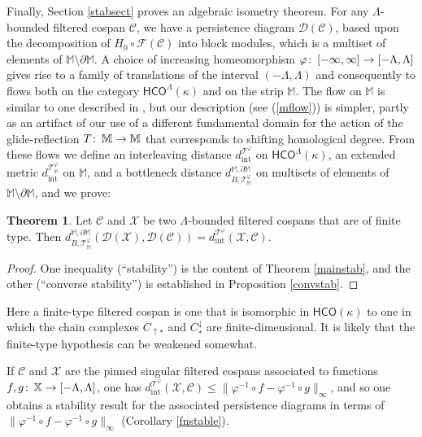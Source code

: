 \documentclass[11pt]{amsart}
\theoremstyle{definition}
\newtheorem{theorem}{Theorem}[section]
\theoremstyle{remark}
\numberwithin{equation}{section}
\def\co{\colon\thinspace}
\begin{document}
Finally, Section \ref{stabsect} proves an algebraic isometry theorem.  For any $\Lambda$-bounded filtered cospan $\mathcal{C}$, we have a persistence diagram $\mathcal{D}(\mathcal{C})$, based upon the decomposition of $H_0\circ\mathcal{F}(\mathcal{C})$ into block modules, which is a multiset of elements of $\mathbb{M}\setminus\partial\mathbb{M}$.  A choice of increasing homeomorphism $\varphi\co [-\infty,\infty]\to [-\Lambda,\Lambda]$ gives rise to a family of translations of the interval $(-\Lambda,\Lambda)$ and consequently to flows both on the category $\mathsf{HCO}^{\Lambda}(\kappa)$ and on the strip $\mathbb{M}$.  The flow on $\mathbb{M}$ is similar to one described in \cite[Section 4]{BBF21}, but our description (see (\ref{mflow})) is simpler, partly as an artifact of our use of a different fundamental domain for the action of the glide-reflection $T\co\mathbb{M}\to\mathbb{M}$ that corresponds to shifting homological degree.  From these flows we define an interleaving distance $d_{\mathrm{int}}^{\mathcal{T}^{\varphi}}$ on $\mathsf{HCO}^{\Lambda}(\kappa)$, an extended metric $d_{\mathrm{int}}^{\mathcal{T}_{\mathbb{M}}^{\varphi}}$ on $\mathbb{M}$, and a bottleneck distance $d_{B,\mathcal{T}_{\mathbb{M}}^{\varphi}}^{\mathbb{M},\partial\mathbb{M}}$ on multisets of elements of $\mathbb{M}\setminus\partial\mathbb{M}$, and we prove:

\begin{theorem}\label{isometry}
	Let $\mathcal{C}$ and $\mathcal{X}$ be two $\Lambda$-bounded filtered cospans that are of finite type.  Then $d_{B,\mathcal{T}_{\mathbb{M}}^{\varphi}}^{\mathbb{M},\partial\mathbb{M}}(\mathcal{D}(\mathcal{X}),\mathcal{D}(\mathcal{C}))= d_{\mathrm{int}}^{\mathcal{T}^{\varphi}}(\mathcal{X},\mathcal{C})$.
\end{theorem} 
\begin{proof}
	One inequality (``stability'') is the content of Theorem \ref{mainstab}, and the other (``converse stability'') is established in Proposition \ref{convstab}.
\end{proof}



Here a finite-type filtered cospan is one that is isomorphic in $\mathsf{HCO}(\kappa)$ to one in which the chain complexes $C_{\uparrow *}$ and $C^{\downarrow}_{*}$ are finite-dimensional.  It is likely that the finite-type hypothesis can be weakened somewhat.

If $\mathcal{C}$ and $\mathcal{X}$ are the pinned singular filtered cospans associated to functions $f,g\co \mathbb{X}\to[-\Lambda,\Lambda]$, one has $d_{\mathrm{int}}^{\mathcal{T}^{\varphi}}(\mathcal{X},\mathcal{C})\leq \|\varphi^{-1}\circ f-\varphi^{-1}\circ g\|_{\infty}$, and so one obtains a stability result for the associated persistence diagrams in terms of $ \|\varphi^{-1}\circ f-\varphi^{-1}\circ g\|_{\infty}$ (Corollary \ref{fnstable}).
\end{document}
